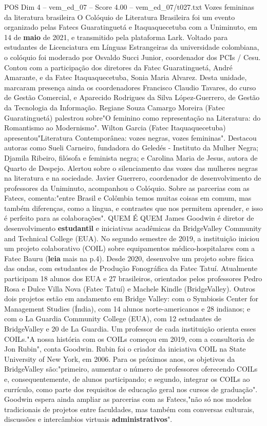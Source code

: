 \begin{textsample}{POS Dim 4 – vem\_ed\_07 – Score 4.00 – vem\_ed\_07/t027.txt}  \label{ex:f4_pos_037}
Vozes femininas da literatura brasileira O Colóquio de Literatura Brasileira foi um evento organizado pelas Fatecs Guaratinguetá e Itaquaquecetuba com a Uniminuto, em 14 de \textbf{maio} de 2021, e transmitido pela plataforma Lark.
Voltado para estudantes de Licenciatura em Línguas Estrangeiras da universidade colombiana, o colóquio foi moderado por Osvaldo Succi Junior, coordenador dos PCIs / Cesu.
Contou com a participação dos diretores da Fatec Guaratinguetá, André Amarante, e da Fatec Itaquaquecetuba, Sonia Maria Alvarez.
Desta unidade, marcaram presença ainda os coordenadores Francisco Claudio Tavares, do curso de Gestão Comercial, e Aparecido Rodrigues da Silva López-Guerrero, de Gestão da Tecnologia da Informação.
Regiane Souza Camargo Moreira (Fatec Guaratinguetá) palestrou sobre"O feminino como representação na Literatura: do Romantismo ao Modernismo".
Wilton Garcia (Fatec Itaquaquecetuba) apresentou"Literatura Contemporânea: vozes negras, vozes femininas".
Destacou autoras como Sueli Carneiro, fundadora do Geledés - Instituto da Mulher Negra; Djamila Ribeiro, filósofa e feminista negra; e Carolina Maria de Jesus, autora de Quarto de Despejo.
Alertou sobre o silenciamento das vozes das mulheres negras na literatura e na sociedade.
Javier Guerrero, coordenador de desenvolvimento de professores da Uniminuto, acompanhou o Colóquio.
Sobre as parcerias com as Fatecs, comenta:"entre Brasil e Colômbia temos muitas coisas em comum, mas também diferenças, como a língua, e contrastes que nos permitem aprender, e isso é perfeito para as colaborações".
QUEM É QUEM James Goodwin é diretor de desenvolvimento \textbf{estudantil} e iniciativas acadêmicas da BridgeValley Community and Technical College (EUA).
No segundo semestre de 2019, a instituição iniciou um projeto colaborativo (COIL) sobre equipamentos médico-hospitalares com a Fatec Bauru (\textbf{leia} mais na p.4).
Desde 2020, desenvolve um projeto sobre física das ondas, com estudantes de Produção Fonográfica da Fatec Tatuí.
Atualmente participam 18 alunos dos EUA e 27 brasileiros, orientados pelos professores Pedro Rosa e Dulce Villa Nova (Fatec Tatuí) e Machele Kindle (BridgeValley).
Outros dois projetos estão em andamento em Bridge Valley: com o Symbiosis Center for Management Studies (Índia), com 14 alunos norte-americanos e 28 indianos; e com o La Guardia Community College (EUA), com 12 estudantes de BridgeValley e 20 de La Guardia.
Um professor de cada instituição orienta esses COILs."A nossa história com os COILs começou em 2019, com a consultoria de Jon Rubin", conta Goodwin.
Rubin foi o criador da iniciativa COIL na State University of New York, em 2006.
Para os próximos anos, os objetivos da BridgeValley são:"primeiro, aumentar o número de professores oferecendo COILs e, consequentemente, de alunos participando; e segundo, integrar os COILs ao currículo, como parte dos requisitos de educação geral nos cursos de graduação".
Goodwin espera ainda ampliar as parcerias com as Fatecs,"não só nos modelos tradicionais de projetos entre faculdades, mas também com conversas culturais, discussões e intercâmbios virtuais \textbf{administrativos}".

\end{textsample}
